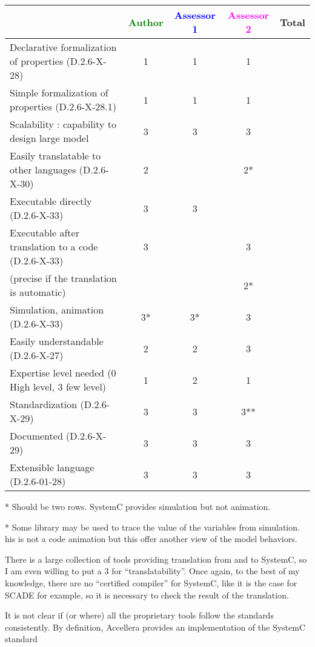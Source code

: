 \begin{tabular}{|l | c | c | c | c|}
  \hline
  & \textcolor{green}{Author} & \textcolor{blue}{Assessor 1} & \textcolor{magenta}{Assessor 2} & Total \\
  \hline
  Declarative formalization of properties (D.2.6-X-28) &1 &1 & 1& \\
  \hline
  Simple formalization of properties (D.2.6-X-28.1) &1 &1 &1 & \\
  \hline
  Scalability : capability to design large model &3 &3 & 3 & \\
  \hline
  Easily translatable to other languages (D.2.6-X-30) & 2 &  & 2* & \\
  \hline
  Executable directly (D.2.6-X-33) &3 & 3  & & \\
  \hline
  Executable after translation to a code (D.2.6-X-33) &3 & &3 & \\
  (precise if the translation is automatic) & & & 2*& \\
  \hline
  Simulation, animation (D.2.6-X-33) &3* &3* &3 & \\
  \hline
  Easily understandable (D.2.6-X-27) &2 &2 &3 & \\
  \hline
  Expertise level needed (0 High level, 3 few level) &1 &2 &1 & \\
  \hline
  Standardization (D.2.6-X-29) &3 &3 &3** & \\
  \hline
  Documented (D.2.6-X-29) &3 &3 &3 & \\
  \hline
  Extensible language (D.2.6-01-28) &3 &3 &3 & \\
  \hline
\end{tabular}

\begin{author_comment}
* Should be two rows. SystemC provides simulation but not animation.
\end{author_comment}
\begin{assessor1}
* Some library may be used to trace the value of  the variables from
simulation. his is not a code animation but this offer another view of
the model behaviors.
\end{assessor1}

\begin{assessor2}
\item[(*)] There is a large collection of tools providing translation
  from and to SystemC, so I am even willing to put a 3 for
  ``translatability''. Once again, to the best of my knowledge, there
  are no ``certified compiler'' for SystemC, like it is the case for
  SCADE for example, so it is necessary to check the result of the
  translation.
\item[(**)] It is not clear if (or where) all the proprietary tools
  follow the standards consistently. By definition, Accellera provides
  an implementation of the SystemC standard 
\end{assessor2}

